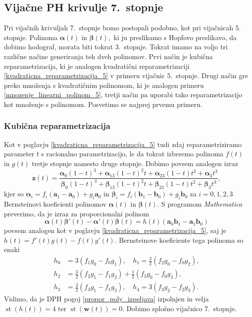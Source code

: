 \documentclass[12pt,a4paper,twoside]{article}
\theoremstyle{definition} %
\theoremstyle{plain} %
\numberwithin{equation}{section}  %
\newcommand{\aV}{\mathbf{a}}
\newcommand{\bV}{\mathbf{b}}
\newcommand{\wV}{\mathbf{w}}
\newcommand{\zV}{\mathbf{z}}
\newcommand{\balpha}{\boldsymbol \alpha}
\newcommand{\bbeta}{\boldsymbol \beta}
\DeclareMathOperator{\st}{st}
\begin{document}
\subsection{Vijačne PH krivulje 7.\ stopnje}

Pri vijačnih krivuljah 7.\ stopnje bomo postopali podobno, kot pri vijačnicah 5.~ stopnje. Polinoma $\balpha(t)$ in $\bbeta(t),$ ki ju preslikamo s Hopfovo preslikavo, da dobimo hodograf, morata biti tokrat 3.\ stopnje. Tokrat imamo na voljo tri različne načine generiranja teh dveh polinomov. Prvi način je kubična reparametrizacija, ki je analogen kvadratični reparametrizaciji \ref{kvadraticna_reparametrizacija_5} v primeru vijačnic 5.\ stopnje. Drugi način gre preko množenja s kvadratičnim polinomom, ki je analogen primeru \ref{mnozenje_linearni_polinom_5}, tretji način pa uporabi tako reparametrizacijo kot množenje s polinomom. Posvetimo se najprej prvemu primeru.

\subsubsection{Kubična reparametrizacija}
\label{kubicna_reparametrizacija_7}

Kot v poglavju \ref{kvadraticna_reparametrizacija_5} tudi zdaj reparametriziramo parameter $t$ s racionalno parametrizacijo, le da tokrat izberemo polinoma $f(t)$ in $g(t)$ tretje stopnje namesto druge stopnje. Dobimo povsem analogen izraz
\begin{equation*}
	\zV(t)=\frac{\balpha_0(1-t)^3+\balpha_13(1-t)^2t+\balpha_23(1-t)t^2+\balpha_3t^3}{\bbeta_0(1-t)^3+\bbeta_13(1-t)^2t+\bbeta_23(1-t)t^2+\bbeta_3t^3},
\end{equation*}
kjer so $\balpha_i=f_i(\aV_1-\aV_0)+g_i\aV_0$ in $\bbeta_i=f_i(\bV_1-\bV_0)+g_i\bV_0$ za $i=0,1,2,3$ Bernsteinovi koeficienti polinomov $\balpha(t)$ in $\bbeta(t).$ S programom \emph{Mathematica} preverimo, da je izraz za proporcionalni polinom
\begin{equation*}
	\balpha(t)\bbeta'(t)-\balpha'(t)\bbeta(t)=h(t)(\aV_0\bV_1-\aV_1\bV_0)
\end{equation*}
povsem analogen kot v poglavju \ref{kvadraticna_reparametrizacija_5}, saj je $h(t)=f'(t)g(t)-f(t)g'(t).$ Bernsteinove koeficiente tega polinoma so enaki
\begin{align}
	\label{h_coeffs_cubic_repara}
	h_0&=3(f_1g_0-f_0g_1),\quad h_1=\frac{3}{2}(f_2g_0-f_0g_2),\nonumber\\
	h_2&=\frac{3}{2}(f_2g_1-f_1g_2)+\frac{1}{2}(f_3g_0-f_0g_3),\nonumber\\
	h_3&=\frac{3}{2}(f_3g_1-f_1g_3),\quad h_4=3(f_3g_2-f_2g_3).
\end{align}
Vidimo, da je DPH pogoj \eqref{propor_poly_izpeljava} izpolnjen in velja $\st(h(t))=4$ ter $\st(\wV(t))=0.$ Dobimo splošno vijačnico 7.\ stopnje.
\end{document}
